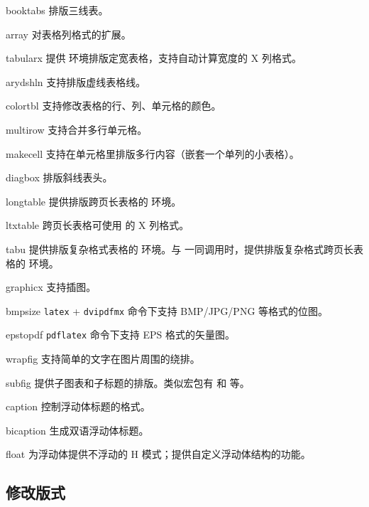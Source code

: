 \begin{pkglist}
  \item[booktabs]  排版三线表。
  \item[array]    对表格列格式的扩展。
  \item[tabularx] 提供  环境排版定宽表格，支持自动计算宽度的 X 列格式。
  \item[arydshln] 支持排版虚线表格线。
  \item[colortbl] 支持修改表格的行、列、单元格的颜色。
  \item[multirow] 支持合并多行单元格。
  \item[makecell] 支持在单元格里排版多行内容（嵌套一个单列的小表格）。
  \item[diagbox]  排版斜线表头。
  \item[longtable] 提供排版跨页长表格的  环境。
  \item[ltxtable] 跨页长表格可使用  的 X 列格式。
  \item[tabu]     提供排版复杂格式表格的  环境。与  一同调用时，提供排版复杂格式跨页长表格的  环境。
  \item[graphicx] 支持插图。
  \item[bmpsize]  \texttt{latex} + \texttt{dvipdfmx} 命令下支持 BMP/JPG/PNG 等格式的位图。
  \item[epstopdf] \texttt{pdflatex} 命令下支持 EPS 格式的矢量图。
  \item[wrapfig]  支持简单的文字在图片周围的绕排。
  \item[subfig]   提供子图表和子标题的排版。类似宏包有  和  等。
  \item[caption]  控制浮动体标题的格式。
  \item[bicaption] 生成双语浮动体标题。
  \item[float]    为浮动体提供不浮动的 H 模式；提供自定义浮动体结构的功能。
\end{pkglist}

\subsection{修改版式}\label{subsec:pkg-layout}

